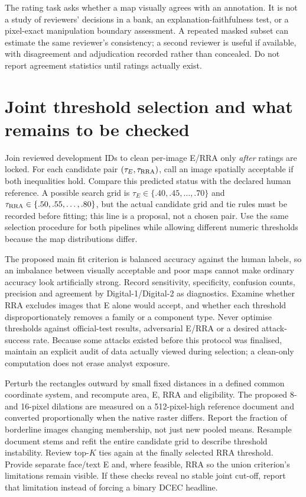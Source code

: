 The rating task asks whether a map visually agrees with an annotation. It is not a study of reviewers' decisions in a bank, an explanation-faithfulness test, or a pixel-exact manipulation boundary assessment. A repeated masked subset can estimate the same reviewer's consistency; a second reviewer is useful if available, with disagreement and adjudication recorded rather than concealed. Do not report agreement statistics until ratings actually exist.

\section{Joint threshold selection and what remains to be checked}
\label{app:clean-metrics-threshold}

Join reviewed development IDs to clean per-image E/RRA only \emph{after} ratings are locked. For each candidate pair $(\tau_E,\tau_{\rm RRA})$, call an image spatially acceptable if both inequalities hold. Compare this predicted status with the declared human reference. A possible search grid is $\tau_E\in\{.40,.45,\ldots,.70\}$ and $\tau_{\rm RRA}\in\{.50,.55,\ldots,.80\}$, but the actual candidate grid and tie rules must be recorded before fitting; this line is a proposal, not a chosen pair. Use the same selection procedure for both pipelines while allowing different numeric thresholds because the map distributions differ.

The proposed main fit criterion is balanced accuracy against the human labels, so an imbalance between visually acceptable and poor maps cannot make ordinary accuracy look artificially strong. Record sensitivity, specificity, confusion counts, precision and agreement by Digital-1/Digital-2 as diagnostics. Examine whether RRA excludes images that E alone would accept, and whether each threshold disproportionately removes a family or a component type. Never optimise thresholds against official-test results, adversarial E/RRA or a desired attack-success rate. Because some attacks existed before this protocol was finalised, maintain an explicit audit of data actually viewed during selection; a clean-only computation does not erase analyst exposure.

Perturb the rectangles outward by small fixed distances in a defined common coordinate system, and recompute area, E, RRA and eligibility. The proposed 8- and 16-pixel dilations are measured on a 512-pixel-high reference document and converted proportionally when the native raster differs. Report the fraction of borderline images changing membership, not just new pooled means. Resample document stems and refit the entire candidate grid to describe threshold instability. Review top-$K$ ties again at the finally selected RRA threshold. Provide separate face/text E and, where feasible, RRA so the union criterion's limitations remain visible. If these checks reveal no stable joint cut-off, report that limitation instead of forcing a binary DCEC headline.

